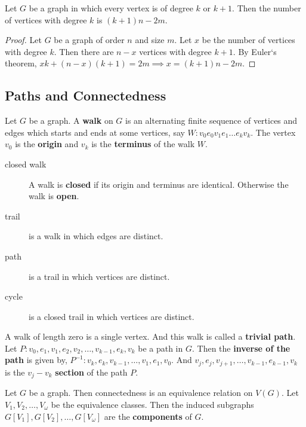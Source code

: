 \begin{exercise}
	Let $G$ be a graph in which every vertex is of degree $k$ or $k+1$. Then the number of vertices with degree $k$ is $(k+1)n-2m$.
\end{exercise}
\begin{proof}
	Let $G$ be a graph of order $n$ and size $m$.
	Let $x$ be the number of vertices with degree $k$.
	Then there are $n-x$ vertices with degree $k+1$.
	By Euler`s theorem, $ xk + (n-x)(k+1) = 2m \implies x = (k+1)n-2m$.
\end{proof}
	
\subsection{Paths and Connectedness}
\begin{definition}
	Let $G$ be a graph. A \textbf{walk} on $G$ is an alternating finite sequence of vertices and edges which starts and ends at some vertices, say $W : v_0 e_0 v_1 e_1 \dots e_k v_k$.
	The vertex $v_0$ is the \textbf{origin} and $v_k$ is the \textbf{terminus} of the walk $W$.
\end{definition}
\begin{description}
	\item[closed walk] A walk is \textbf{closed} if its origin and terminus are identical. Otherwise the walk is \textbf{open}.
	\item[trail] is a walk in which edges are distinct.
	\item[path] is a trail in which vertices are distinct.
	\item[cycle] is a closed trail in which vertices are distinct.
\end{description}

\begin{remark}
	A walk of length zero is a single vertex. And this walk is called a \textbf{trivial path}.
	Let $P : v_0,e_1,v_1,e_2,v_2,\dots,v_{k-1},e_k,v_k$ be a path in $G$. Then the \textbf{inverse of the path} is given by, $P^{-1} : v_k,e_k,v_{k-1},\dots,v_1,e_1,v_0$.
	And $v_j,e_j,v_{j+1},\dots,v_{k-1},e_{k-1},v_k$ is the $v_j-v_k$ \textbf{section} of the path $P$.
\end{remark}

\begin{definition}
	Let $G$ be a graph. Then connectedness is an equivalence relation on $V(G)$. Let $V_1,V_2,\dots,V_\omega$ be the equivalence classes. Then the induced subgraphs $G[V_1], G[V_2], \dots, G[V_\omega]$ are the \textbf{components} of $G$.
\end{definition}

